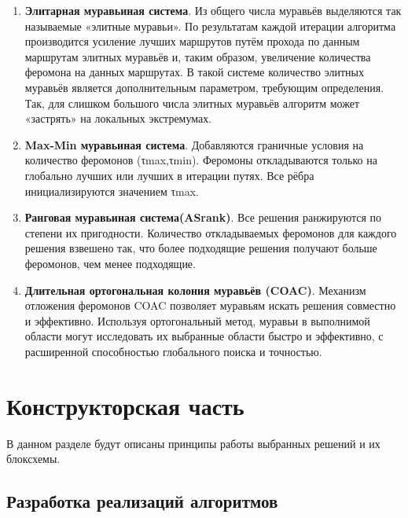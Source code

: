 \documentclass[a4paper, 14pt]{article}
\begin{document}
\begin{enumerate}

\item \textbf{Элитарная муравьиная система}.
Из общего числа муравьёв выделяются так называемые «элитные муравьи». По результатам каждой итерации алгоритма производится усиление лучших маршрутов путём прохода по данным маршрутам элитных муравьёв и, таким образом, увеличение количества феромона на данных маршрутах. В такой системе количество элитных муравьёв является дополнительным параметром, требующим определения. Так, для слишком большого числа элитных муравьёв алгоритм может «застрять» на локальных экстремумах.

\item \textbf{Max-Min муравьиная система}.
Добавляются граничные условия на количество феромонов (τmax,τmin). Феромоны откладываются только на глобально лучших или лучших в итерации путях. Все рёбра инициализируются значением τmax.

\item \textbf{Ранговая муравьиная система(ASrank)}.
Все решения ранжируются по степени их пригодности. Количество откладываемых феромонов для каждого решения взвешено так, что более подходящие решения получают больше феромонов, чем менее подходящие.

\item \textbf{Длительная ортогональная колония муравьёв (COAC)}.
Механизм отложения феромонов COAC позволяет муравьям искать решения совместно и эффективно. Используя ортогональный метод, муравьи в выполнимой области могут исследовать их выбранные области быстро и эффективно, с расширенной способностью глобального поиска и точностью.

\end{enumerate}
	
		\newpage
	\section{Конструкторская часть}
	\hspace{1cm}В данном разделе будут описаны принципы работы выбранных решений и их блоксхемы.
	\subsection{Разработка реализаций алгоритмов}
	
\end{document}

